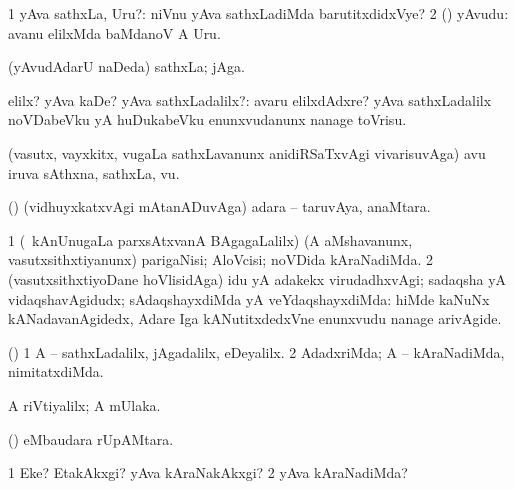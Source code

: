 \bentry
{}
\gl{\sanA}
\expl{}
\bmng
\bnum
\num{1} yAva sathxLa, Uru?:  niVnu yAva sathxLadiMda barutitxdidxVye? 
\num{2} (\AmA) yAvudu:  avanu elilxMda baMdanoV A Uru. 
\enum
\emng
\eentry

\bentry
{}
\gl{\nA}
\expl{}
\bmng
(yAvudAdarU naDeda) sathxLa; jAga. 
\emng
\eentry

\bentry
{} 
\gl{\kirxvi}
\expl{}
\bmng
elilx? yAva kaDe? yAva sathxLadalilx?:  avaru elilxdAdxre?  yAva sathxLadalilx noVDabeVku yA huDukabeVku enunxvudanunx nanage toVrisu. 
\emng
\eentry

\bentry
{}
\pron{}
\gl{\nA}
\expl{}
\bmng
(vasutx, vayxkitx, \mo vugaLa sathxLavanunx anidiRSaTxvAgi vivarisuvAga) avu iruva sAthxna, sathxLa, \mo vu. 
\emng
\eentry

\bentry
{} 
\gl{\saMavayx}
\expl{}
\bmng
(\aupa) (vidhuyxkatxvAgi mAtanADuvAga) adara -- taruvAya, anaMtara. 
\emng
\eentry

\bentry
{} 
\gl{\saMavayx}
\expl{}
\bmng
\bnum
\num{1} (\kanmu\ kAnUnugaLa parxsAtxvanA BAgagaLalilx) (A aMshavanunx, vasutxsithxtiyanunx) parigaNisi; AloVcisi; noVDida kAraNadiMda. 
\num{2} (vasutxsithxtiyoDane hoVlisidAga) idu yA adakekx virudadhxvAgi; sadaqsha yA vidaqshavAgidudx; sAdaqshayxdiMda yA veYdaqshayxdiMda:  hiMde kaNuNx kANadavanAgidedx, Adare Iga kANutitxdedxVne enunxvudu nanage arivAgide. 
\enum
\emng
\eentry

\bentry
{} 
\gl{\saMavayx}
\expl{}
\bmng
(\pArxparx) 
\bnum
\num{1} A -- sathxLadalilx, jAgadalilx, eDeyalilx. 
\num{2} AdadxriMda; A -- kAraNadiMda, nimitatxdiMda. 
\enum
\emng
\eentry

\bentry
{} 
\gl{\saMavayx}
\expl{}
\bmng
A riVtiyalilx; A mUlaka. 
\emng
\eentry

\bentry
{} 
\expl{}
\bmng
(\kAparx)  eMbaudara rUpAMtara. 
\emng
\eentry

\bentry
{} 
\gl{\kirxvi}
\expl{(\pArxparx) }
\bmng
\bnum
\num{1} Eke? EtakAkxgi? yAva kAraNakAkxgi? 
\num{2} yAva kAraNadiMda? 
\enum
\emng
\eentry

